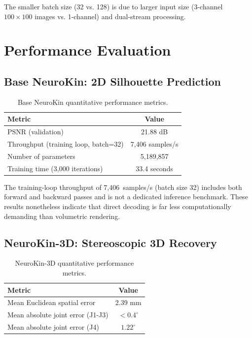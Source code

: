 \documentclass[12pt,a4paper,oneside]{report}
\begin{document}
The smaller batch size (32 vs. 128) is due to larger input size (3-channel $100 \times 100$ images vs. 1-channel) and dual-stream processing.
\section{Performance Evaluation}
\subsection{Base NeuroKin: 2D Silhouette Prediction}
\begin{table}[H]
\centering

\caption{Base NeuroKin quantitative performance metrics.}
\label{tab:neurokin_performance}
\begin{tabular}{lc}
\toprule

Metric & Value \\
\midrule

PSNR (validation) & 21.88 dB \\

Throughput (training loop, batch=32) & 7,406 samples/s \\

Number of parameters & 5,189,857 \\

Training time (3,000 iterations) & 33.4 seconds \\
\bottomrule

\end{tabular}
\end{table}

The training-loop throughput of 7,406~samples/s (batch size 32) includes both forward and backward passes and is not a dedicated inference benchmark. These results nonetheless indicate that direct decoding is far less computationally demanding than volumetric rendering.
\subsection{NeuroKin-3D: Stereoscopic 3D Recovery}
\begin{table}[H]
\centering

\caption{NeuroKin-3D quantitative performance metrics.}
\label{tab:neurokin3d_performance}
\begin{tabular}{lc}
\toprule

Metric & Value \\
\midrule

Mean Euclidean spatial error & 2.39 mm \\

Mean absolute joint error (J1-J3) & $<0.4^\circ$ \\

Mean absolute joint error (J4) & $1.22^\circ$ \\
\bottomrule

\end{tabular}
\end{table}
\end{document}
